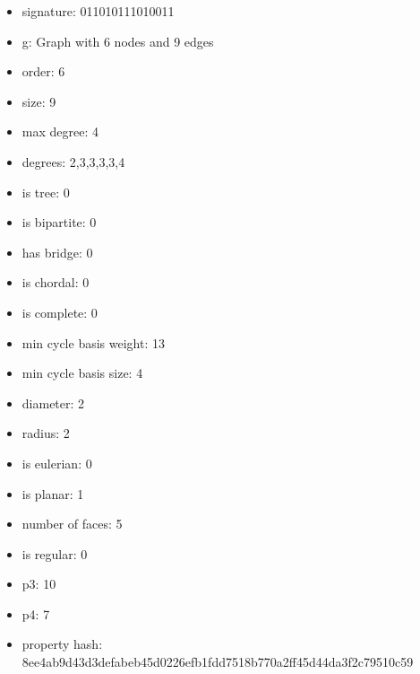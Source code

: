 \begin{itemize}
\item signature: 011010111010011
\item g: Graph with 6 nodes and 9 edges
\item order: 6
\item size: 9
\item max degree: 4
\item degrees: 2,3,3,3,3,4
\item is tree: 0
\item is bipartite: 0
\item has bridge: 0
\item is chordal: 0
\item is complete: 0
\item min cycle basis weight: 13
\item min cycle basis size: 4
\item diameter: 2
\item radius: 2
\item is eulerian: 0
\item is planar: 1
\item number of faces: 5
\item is regular: 0
\item p3: 10
\item p4: 7
\item property hash: 8ee4ab9d43d3defabeb45d0226efb1fdd7518b770a2ff45d44da3f2c79510c59
\end{itemize}
\newpage
\begin{figure}
\end{figure}
